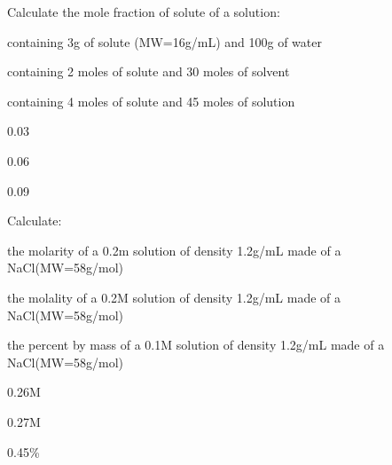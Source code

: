 \documentclass[main.tex]{subfiles}
\begin{document}
\begin{multicols*}{2}
\begin{question}[ID=\the\value{numA}]
Calculate the mole fraction of solute of a solution: 
\begin{inparaenum}[(a)]
\item  containing 3g of solute (MW=16g/mL) and 100g of water %
\item  containing 2 moles of solute and 30 moles of solvent %
\item  containing 4 moles of solute and 45 moles of solution %
 \end{inparaenum}
\end{question}
\begin{solution}
\begin{inparaenum}[(a)]
\item   0.03
\item   0.06
\item   0.09
 \end{inparaenum}\hspace{0.1cm}\end{solution}%

\begin{question}[ID=\the\value{numA}]
Calculate: 
\begin{inparaenum}[(a)]
\item  the molarity of a 0.2m solution of density 1.2g/mL made of a NaCl(MW=58g/mol) %
\item  the molality of a 0.2M solution of density 1.2g/mL made of a NaCl(MW=58g/mol) %
\item  the percent by mass of a 0.1M solution of density 1.2g/mL made of a NaCl(MW=58g/mol) %
 \end{inparaenum}
\end{question}
\begin{solution}
\begin{inparaenum}[(a)]
\item  0.26M
\item   0.27M
\item   0.45\%
 \end{inparaenum}\hspace{0.1cm}\end{solution}%




\end{multicols*}
\end{document}
